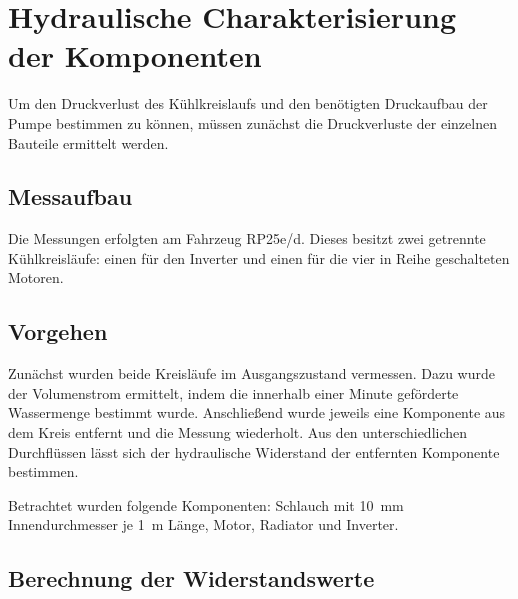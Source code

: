 \section{Hydraulische Charakterisierung der Komponenten}
\label{sec:hydraulik}

Um den Druckverlust des Kühlkreislaufs und den benötigten Druckaufbau der Pumpe
bestimmen zu können, müssen zunächst die Druckverluste der einzelnen Bauteile
ermittelt werden.

\subsection{Messaufbau}
\label{subsec:hydraulik_messaufbau}

Die Messungen erfolgten am Fahrzeug RP25e/d. Dieses besitzt zwei getrennte
Kühlkreisläufe: einen für den Inverter und einen für die vier in Reihe
geschalteten Motoren.


\subsection{Vorgehen}
\label{subsec:hydraulik_vorgehen}

Zunächst wurden beide Kreisläufe im Ausgangszustand vermessen. Dazu wurde
der Volumenstrom ermittelt, indem die innerhalb einer Minute geförderte
Wassermenge bestimmt wurde. Anschließend wurde jeweils eine Komponente aus dem
Kreis entfernt und die Messung wiederholt. Aus den unterschiedlichen
Durchflüssen lässt sich der hydraulische Widerstand der entfernten Komponente
bestimmen.

Betrachtet wurden folgende Komponenten: Schlauch mit \SI{10}{mm}
Innendurchmesser je \SI{1}{m} Länge, Motor, Radiator und
Inverter.

\subsection{Berechnung der Widerstandswerte}
\label{subsec:hydraulik_berechnung}

